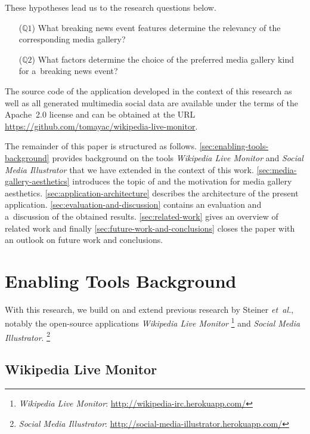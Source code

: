 \documentclass{sig-alternate-somus}
\newcommand{\inlinelistingsize}{\fontsize{8pt}{11pt}}
\let\oldurl\url
\renewcommand{\url}[1]{\inlinelistingsize\oldurl{#1}}
\begin{document}
\noindent These hypotheses lead us to the research questions below.

\begin{itemize}
  \itemsep0em
  \item[($\mathbb{Q}1$)] What breaking news event features
    determine the relevancy of the corresponding media gallery?
  \item[($\mathbb{Q}2$)] What factors determine the choice
    of the preferred media gallery kind for a~breaking news event?
\end{itemize}

The source code of the application developed
in the context of this research as well as all generated
multimedia social data
are available under the terms of the Apache~2.0 license
and can be obtained at the URL \url{https://github.com/tomayac/wikipedia-live-monitor}.

The remainder of this paper is structured as follows.
\autoref{sec:enabling-tools-background} provides background
on the tools \emph{Wikipedia Live Monitor} and
\emph{Social Media Illustrator} that we have extended
in the context of this work.
\autoref{sec:media-gallery-aesthetics} introduces the topic of
and the motivation for media gallery aesthetics.
\autoref{sec:application-architecture} describes the architecture
of the present application.
\autoref{sec:evaluation-and-discussion} contains an evaluation
and a~discussion of the obtained results.
\autoref{sec:related-work} gives an overview of related work
and finally \autoref{sec:future-work-and-conclusions}
closes the paper with an outlook on future work
and conclusions.

\section{Enabling Tools Background}
\label{sec:enabling-tools-background}
\selectfont

With this research, we build on and extend previous research
by Steiner \emph{et~al.}, notably
the open-source applications \emph{Wikipedia Live Monitor}%
\footnote{\emph{Wikipedia Live Monitor}:
\url{http://wikipedia-irc.herokuapp.com/}}
and \emph{Social Media Illustrator}.%
\footnote{\emph{Social Media Illustrator}:
\url{http://social-media-illustrator.herokuapp.com/}}

\subsection{Wikipedia Live Monitor}
\end{document}
